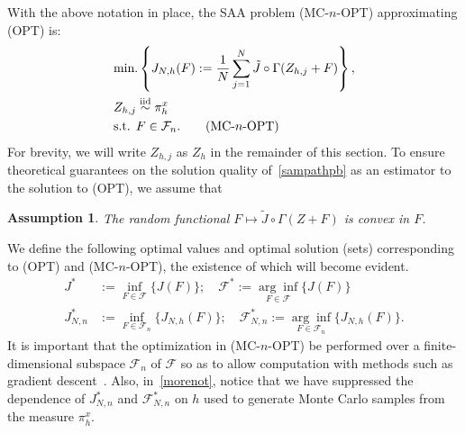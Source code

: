 \documentclass[11pt,leqno]{amsart}
\newtheorem{assumption}{Assumption}
\begin{document}
With the above notation in place, the SAA problem (MC-$n$-OPT) approximating (OPT) is:
\begin{align}\label{sampathpb}
& \mbox{min.} \left\{ J_{N,h}(F) := \frac{1}{N} \sum_{j=1}^N \tilde{J}\circ \Gamma(Z_{h,j}+F)\right\}, \nonumber \\
& Z_{h,j} \overset{\scriptsize \mbox{iid}}{\sim} \pi^x_{h} \nonumber \\ & \mbox{s.t. } F \in \mathcal{F}_n. \tag{MC-$n$-OPT}
\end{align} 
For brevity, we will write $Z_{h,j}$ as $Z_h$ in the remainder of this section. To ensure theoretical guarantees on the solution quality of~\eqref{sampathpb} as an estimator to the solution to (OPT), we assume that \begin{assumption}\label{ass:Jtildeconv} The random functional %
$F \mapsto \tilde J\circ \Gamma (Z+F)$ is convex in $F$.
\end{assumption} 
We define the following optimal values and optimal solution (sets) corresponding to (OPT) and (MC-$n$-OPT), the existence of which will become evident. \begin{align}\label{morenot} J^* &:= \inf_{F \in \mathcal{F}} \{J(F)\}; \quad \mathcal{F}^* {:=} \underset{F \in \mathcal{F}}{\arg\inf} \{J(F)\} \\%
J_{N,n}^* &:= \inf_{F \in \mathcal{F}_n} \{J_{N,h}(F)\}; \quad \mathcal{F}_{N,n}^* {:=} \underset{F \in \mathcal{F}_n}{\arg\inf} \{J_{N,h}(F)\}. \nonumber \end{align}
It is important that the optimization in (MC-$n$-OPT) be performed over a finite-dimensional subspace $\mathcal{F}_n$ of $\mathcal{F}$ so as to allow computation with methods such as gradient descent~\citep{2004nes}. Also, in~\eqref{morenot}, notice that we have suppressed the dependence of $J^*_{N,n}$ and $\mathcal{F}^*_{N,n}$ on $h$ used to generate Monte Carlo samples from the measure $\pi^x_{h}$. 
\end{document}
